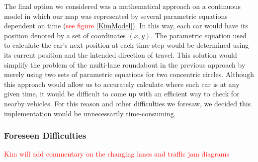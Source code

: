 \documentclass{article}
\begin{document}
    The final option we considered was a mathematical approach on a continuous model in which our map was represented by several parametric equations dependent on time (\textcolor{red}{see figure \ref{KimModel}}). In this way, each car would have its position denoted by a set of coordinates $(x,y)$. The parametric equation used to calculate the car's next position at each time step would be determined using its current position and the intended direction of travel. This solution would simplify the problem of the  multi-lane roundabout in the previous approach by merely using two sets of parametric equations for two concentric circles. Although this approach would allow us to accurately calculate where each car is at any given time, it would be difficult to come up with an efficient way to check for nearby vehicles. For this reason and other difficulties we foresaw, we decided this implementation would be unnecessarily time-consuming.  


\subsubsection{Foreseen Difficulties}

\textcolor{red}{Kim will add commentary on the changing lanes and traffic jam diagrams}
\end{document}
